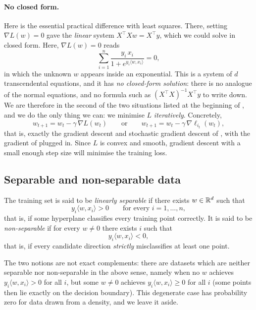 \paragraph{No closed form.}
Here is the essential practical difference with least squares. There, setting $\nabla
L(w) = 0$ gave the \emph{linear} system $X^\top X w = X^\top y$, which we could solve
in closed form. Here, $\nabla L(w) = 0$ reads
\[
\sum_{i=1}^n \frac{y_i \, x_i}{1 + e^{y_i \langle w, x_i \rangle}} = 0 ,
\]
in which the unknown $w$ appears inside an exponential. This is a system of $d$
transcendental equations, and it has \emph{no closed-form solution}: there is no
analogue of the normal equations, and no formula such as $(X^\top X)^{-1} X^\top y$ to
write down. We are therefore in the second of the two situations listed at the
beginning of , and we do the only thing we can: we minimise $L$
\emph{iteratively}. Concretely,
\[
w_{t+1} = w_t - \gamma\, \nabla L(w_t)
\qquad\text{or}\qquad
w_{t+1} = w_t - \gamma\, \nabla \ell_{i_t}(w_t) ,
\]
that is, exactly the gradient descent and stochastic gradient descent of
, with the gradient of  plugged in. Since $L$
is convex and smooth, gradient descent with a small enough step size will minimise the training loss.

\subsection{Separable and non-separable data}
\label{subsec:separable}

\begin{definition}
The training set is said to be \emph{linearly separable} if there exists $w \in \mathbb{R}^d$ such that
\[
y_i \langle w, x_i \rangle > 0 \qquad \text{for every } i = 1, \dots, n ,
\]
that is, if some hyperplane classifies every training point correctly. It is said to be
\emph{non-separable} if for every $w \neq 0$ there exists $i$ such that
\[
y_i \langle w, x_i \rangle < 0 ,
\]
that is, if every candidate direction \emph{strictly} misclassifies at least one point.
\end{definition}

\begin{remark}
The two notions are not exact complements: there are datasets which are neither
separable nor non-separable in the above sense, namely when no $w$ achieves $y_i
\langle w, x_i \rangle > 0$ for all $i$, but some $w \neq 0$ achieves $y_i \langle w,
x_i \rangle \geq 0$ for all $i$ (some points then lie exactly on the decision
boundary). This degenerate case has probability zero for data drawn from a density,
and we leave it aside.
\end{remark}

